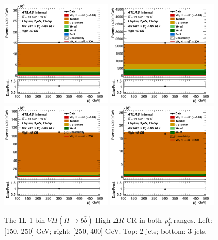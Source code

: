 \begin{figure}[h!]
\center
\includegraphics[width=0.48\textwidth]{Images/VH/SRsandTopCRs/Region_distpTV_DCRHigh_BMax250_L1_Y6051_TTypebb_T2_J2_BMin150_Prefit.png}
\includegraphics[width=0.48\textwidth]{Images/VH/SRsandTopCRs/Region_distpTV_DCRHigh_BMax400_L1_Y6051_TTypebb_T2_J2_BMin250_Prefit.png}\\
\includegraphics[width=0.48\textwidth]{Images/VH/SRsandTopCRs/Region_distpTV_DCRHigh_BMax250_L1_Y6051_TTypebb_T2_J3_BMin150_Prefit.png}
\includegraphics[width=0.48\textwidth]{Images/VH/SRsandTopCRs/Region_distpTV_DCRHigh_BMax400_L1_Y6051_TTypebb_T2_J3_BMin250_Prefit.png}
\caption{The 1L 1-bin  $VH(H\rightarrow b\bar{b})$ High $\Delta R$ CR in both $p_T^V$ ranges. Left: [150, 250] GeV; right: [250, 400] GeV. Top: 2 jets; bottom: 3 jets.} 
\label{fig:vhbbDRCR}
\end{figure}


